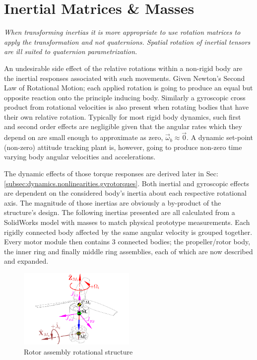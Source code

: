 \section{Inertial Matrices \& Masses}
\label{sec:proto.inertia}
\emph{\color{Gray}When transforming inertias it is more appropriate to use rotation matrices to apply the transformation and not quaternions. Spatial rotation of inertial tensors are ill suited to quaternion parametrization.}
\par
An undesirable side effect of the relative rotations within a non-rigid body are the inertial responses associated with such movements. Given Newton's Second Law of Rotational Motion; each applied rotation is going to produce an equal but opposite reaction onto the principle inducing body. Similarly a gyroscopic cross product from rotational velocities is also present when rotating bodies that have their own relative rotation. Typically for most rigid body dynamics, such first and second order effects are negligible given that the angular rates which they depend on are small enough to approximate as zero, $\vec{\omega}_b\approx\vec{0}$. A dynamic set-point (non-zero) attitude tracking plant is, however, going to produce non-zero time varying body angular velocities and accelerations.
\par
The dynamic effects of those torque responses are derived later in Sec:\ref{subsec:dynamics.nonlinearities.gyrotorques}. Both inertial and gyroscopic effects are dependent on the considered body's inertia about each respective rotational axis. The magnitude of those inertias are obviously a by-product of the structure's design. The following inertias presented are all calculated from a SolidWorks model with masses to match physical prototype measurements. Each rigidly connected body affected by the same angular velocity is grouped together. Every motor module then contains 3 connected bodies; the propeller/rotor body, the inner ring and finally middle ring assemblies, each of which are now described and expanded. 
\begin{figure}[hbtp]
\vspace{-6pt}
\centering
\includegraphics[width=0.5\textwidth]{figs/inertia-prop}
\caption{Rotor assembly rotational structure}
\label{fig:inertia-prop}
\vspace{-10pt}
\end{figure}

